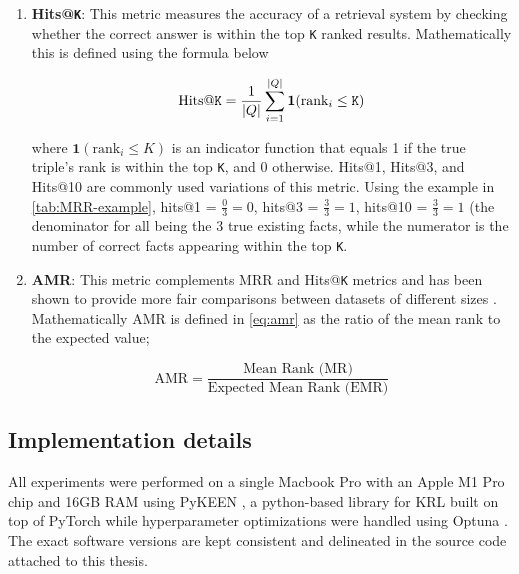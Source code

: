\begin{enumerate}
\item 
\textbf{Hits@\texttt{K}}: This metric measures the accuracy of a retrieval system by checking whether the correct answer is within the top \texttt{K} ranked results. Mathematically this is defined using the formula below

\begin{equation}
    \text{Hits@\texttt{K}} = \frac{1}{|Q|} \sum_{i=1}^{|Q|} \mathbf{1}(\text{rank}_i \leq \texttt{K})
\end{equation}

where \(\mathbf{1}(\text{rank}_i \leq K)\) is an indicator function that equals 1 if the true triple's rank is within the top \texttt{K}, and 0 otherwise. Hits@1, Hits@3, and Hits@10 are commonly used variations of this metric. Using the example in \autoref{tab:MRR-example}, hits@1 = $\frac{0}{3} = 0$, hits@3 = $\frac{3}{3} = 1$, hits@10 = $\frac{3}{3} = 1$ (the denominator for all being the 3 true existing facts, while the numerator is the number of correct facts appearing within the top \texttt{K}.  

\item 
\textbf{\ac{AMR}}: This metric complements \ac{MRR} and Hits@\texttt{K} metrics and has been shown to provide more fair comparisons between datasets of different sizes \citep{Berrendorf2020OnMethods}. Mathematically \ac{AMR} is defined in \autoref{eq:amr} as the ratio of the mean rank to the expected value;

\begin{equation}
\label{eq:amr}
\text{AMR} = \frac{\text{Mean Rank (MR)}}{\text{Expected Mean Rank (EMR)}}
\end{equation}

\end{enumerate}

\subsection{Implementation details}
All experiments were performed on a single Macbook Pro with an  Apple M1 Pro chip and 16GB RAM using PyKEEN \citep{Ali2020PyKEENEmbeddings}, a python-based library for \ac{KRL} built on top of PyTorch while hyperparameter optimizations were handled using Optuna \citep{Akiba2019Optuna:Framework}. The exact software versions are kept consistent and delineated in the source code attached to this thesis.